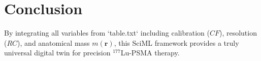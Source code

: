 \documentclass[11pt,a4paper]{article}
\begin{document}
\section{Conclusion}
By integrating all variables from `table.txt` including calibration ($CF$), resolution ($RC$), and anatomical mass $m(\mathbf{r})$, this SciML framework provides a truly universal digital twin for precision $^{177}$Lu-PSMA therapy.



\end{document}
